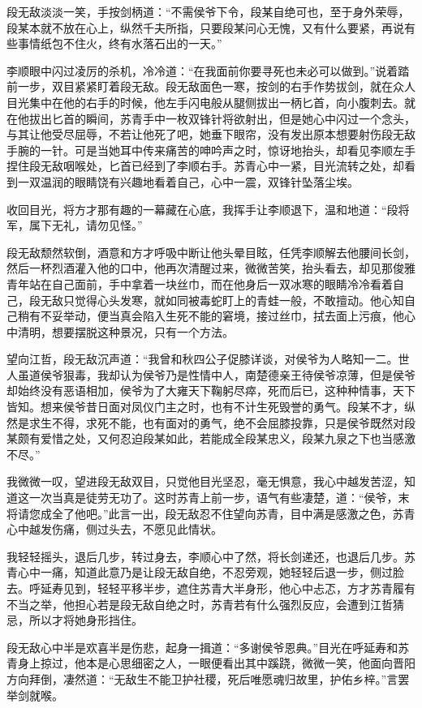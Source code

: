 段无敌淡淡一笑，手按剑柄道：“不需侯爷下令，段某自绝可也，至于身外荣辱，段某本就不放在心上，纵然千夫所指，只要段某问心无愧，又有什么要紧，再说有些事情纸包不住火，终有水落石出的一天。”

李顺眼中闪过凌厉的杀机，冷冷道：“在我面前你要寻死也未必可以做到。”说着踏前一步，双目紧紧盯着段无敌。段无敌面色一寒，按剑的右手作势拔剑，就在众人目光集中在他的右手的时候，他左手闪电般从腿侧拔出一柄匕首，向小腹刺去。就在他拔出匕首的瞬间，苏青手中一枚双锋针将欲射出，但是她心中闪过一个念头，与其让他受尽屈辱，不若让他死了吧，她垂下眼帘，没有发出原本想要射伤段无敌手腕的一针。可是当她耳中传来痛苦的呻吟声之时，惊讶地抬头，却看见李顺左手捏住段无敌咽喉处，匕首已经到了李顺右手。苏青心中一紧，目光流转之处，却看到一双温润的眼睛饶有兴趣地看着自己，心中一震，双锋针坠落尘埃。

收回目光，将方才那有趣的一幕藏在心底，我挥手让李顺退下，温和地道：“段将军，属下无礼，请勿见怪。”

段无敌颓然软倒，酒意和方才呼吸中断让他头晕目眩，任凭李顺解去他腰间长剑，然后一杯烈酒灌入他的口中，他再次清醒过来，微微苦笑，抬头看去，却见那俊雅青年站在自己面前，手中拿着一块丝巾，而在他身后一双冰寒的眼睛冷冷看着自己，段无敌只觉得心头发寒，就如同被毒蛇盯上的青蛙一般，不敢擅动。他心知自己稍有不妥举动，便当真会陷入生死不能的窘境，接过丝巾，拭去面上污痕，他心中清明，想要摆脱这种景况，只有一个方法。

望向江哲，段无敌沉声道：“我曾和秋四公子促膝详谈，对侯爷为人略知一二。世人虽道侯爷狠毒，我却认为侯爷乃是性情中人，南楚德亲王待侯爷凉薄，但是侯爷却始终没有恶语相加，侯爷为了大雍天下鞠躬尽瘁，死而后已，这种种情事，天下皆知。想来侯爷昔日面对凤仪门主之时，也有不计生死毁誉的勇气。段某不才，纵然是求生不得，求死不能，也有面对的勇气，绝不会屈膝投靠，只是侯爷既然对段某颇有爱惜之处，又何忍迫段某如此，若能成全段某忠义，段某九泉之下也当感激不尽。”

我微微一叹，望进段无敌双目，只觉他目光坚忍，毫无惧意，我心中越发苦涩，知道这一次当真是徒劳无功了。这时苏青上前一步，语气有些凄楚，道：“侯爷，末将请您成全了他吧。”此言一出，段无敌忍不住望向苏青，目中满是感激之色，苏青心中越发伤痛，侧过头去，不愿见此情状。

我轻轻摇头，退后几步，转过身去，李顺心中了然，将长剑递还，也退后几步。苏青心中一痛，知道此意乃是让段无敌自绝，不忍旁观，她轻轻后退一步，侧过脸去。呼延寿见到，轻轻平移半步，遮住苏青大半身形，他心中忐忑，方才苏青履有不当之举，他担心若是段无敌自绝之时，苏青若有什么强烈反应，会遭到江哲猜忌，所以才将她身形挡住。

段无敌心中半是欢喜半是伤悲，起身一揖道：“多谢侯爷恩典。”目光在呼延寿和苏青身上掠过，他本是心思细密之人，一眼便看出其中蹊跷，微微一笑，他面向晋阳方向拜倒，凄然道：“无敌生不能卫护社稷，死后唯愿魂归故里，护佑乡梓。”言罢举剑就喉。

